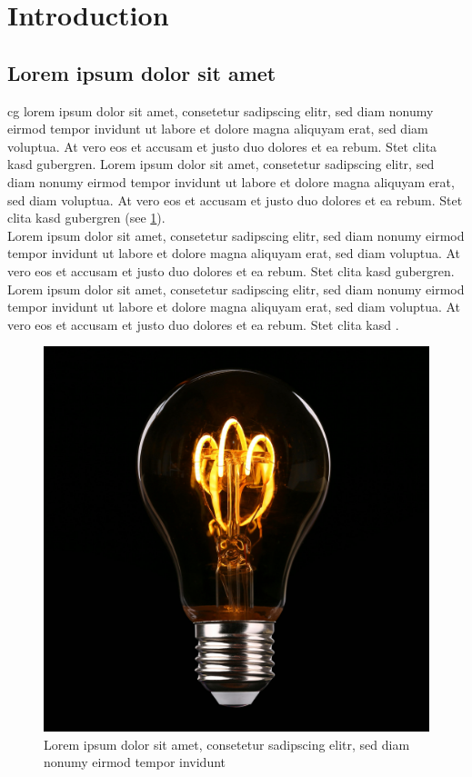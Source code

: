 \section{Introduction}\label{sec:introduction}

\subsection{Lorem ipsum dolor sit amet}
\noindent
\gls{cg} lorem ipsum dolor sit amet, consetetur sadipscing elitr, sed diam nonumy eirmod tempor invidunt ut labore et dolore magna aliquyam erat, sed diam voluptua. At vero eos et accusam et justo duo dolores et ea rebum. Stet clita kasd gubergren. Lorem ipsum dolor sit amet, consetetur sadipscing elitr, sed diam nonumy eirmod tempor invidunt ut labore et dolore magna aliquyam erat, sed diam voluptua. At vero eos et accusam et justo duo dolores et ea rebum. Stet clita kasd gubergren (see  \cref{fig:first_figure}).\\

\noindent
Lorem ipsum dolor sit amet, consetetur sadipscing elitr, sed diam nonumy eirmod tempor invidunt ut labore et dolore magna aliquyam erat, sed diam voluptua. At vero eos et accusam et justo duo dolores et ea rebum. Stet clita kasd gubergren. Lorem ipsum dolor sit amet, consetetur sadipscing elitr, sed diam nonumy eirmod tempor invidunt ut labore et dolore magna aliquyam erat, sed diam voluptua. At vero eos et accusam et justo duo dolores et ea rebum. Stet clita kasd \cite{McBoatfaceLorem2001}. 

\begin{figure}[H]
	\centering
	\captionsetup{justification=centering}
	\includegraphics[width=0.7\linewidth, frame]{img/figure.jpg}
	\caption{Lorem ipsum dolor sit amet, consetetur sadipscing elitr, sed diam nonumy eirmod tempor invidunt}
	\label{fig:first_figure}
\end{figure}
